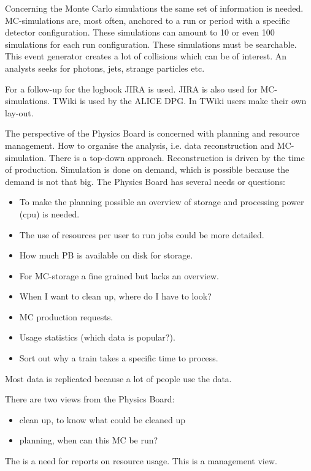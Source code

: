 Concerning the Monte Carlo simulations the same set of information is needed. MC-simulations are, most often, anchored to a run or period with a specific detector configuration. These simulations can amount to 10 or even 100 simulations for each run configuration. These simulations must be searchable. This event generator creates a lot of collisions which can be of interest. An analysts seeks for photons, jets, strange particles etc.

For a follow-up for the logbook JIRA is used. JIRA is also used for MC-simulations. TWiki is used by the ALICE DPG. In TWiki users make their own lay-out. 

The perspective of the Physics Board is concerned with planning and resource management. How to organise the analysis, i.e. data reconstruction and MC-simulation. There is a top-down approach. Reconstruction is driven by the time of production. Simulation is done on demand, which is possible because the demand is not that big. The Physics Board has several needs or questions:
\begin{itemize}
  \item To make the planning possible an overview of storage and processing power (cpu) is needed. 
  \item The use of resources per user to run jobs could be more detailed.
  \item How much PB is available on disk for storage.
  \item For MC-storage a fine grained but lacks an overview.
  \item When I want to clean up, where do I have to look?
  \item MC production requests.
  \item Usage statistics (which data is popular?).
  \item Sort out why a train takes a specific time to process.
\end{itemize}
Most data is replicated because a lot of people use the data.

There are two views from the Physics Board:
\begin{itemize}
  \item clean up, to know what could be cleaned up
  \item planning, when can this MC be run?
\end{itemize}
The is a need for reports on resource usage. This is a management view.






